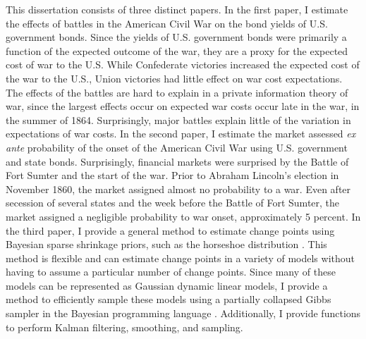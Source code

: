 
This dissertation consists of three distinct papers.
In the first paper, I estimate the effects of battles in the American Civil War on the bond yields of U.S. government bonds.
Since the yields of U.S. government bonds were primarily a function of the expected outcome of the war, they are a proxy for the expected cost of war to the U.S.
While Confederate victories increased the expected cost of the war to the U.S., Union victories had little effect on war cost expectations.
The effects of the battles are hard to explain in a private information theory of war, since the largest effects occur on expected war costs occur late in the war, in the summer of 1864.
Surprisingly, major battles explain little of the variation in expectations of war costs.
In the second paper, I estimate the market assessed \textit{ex ante} probability of the onset of the American Civil War using U.S. government and state bonds.
Surprisingly, financial markets were surprised by the Battle of Fort Sumter and the start of the war.
Prior to Abraham Lincoln's election in November 1860, the market assigned almost no probability to a war.
Even after secession of several states and the week before the Battle of Fort Sumter, the market assigned a negligible probability to war onset, approximately 5 percent.
In the third paper, I provide a general method to estimate change points using Bayesian sparse shrinkage priors, such as the horseshoe distribution \parencite{CarvalhoPolsonScott2010}.
This method is flexible and can estimate change points in a variety of models without having to assume a particular number of change points.
Since many of these models can be represented as Gaussian dynamic linear models, I provide a method to efficiently sample these models using a partially collapsed Gibbs sampler in the Bayesian programming language \Stan{}.
Additionally, I provide \Stan{} functions to perform Kalman filtering, smoothing, and sampling.




